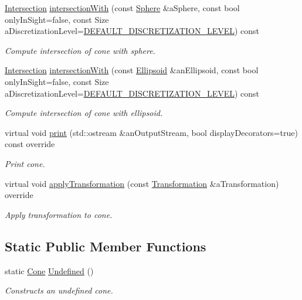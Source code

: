 \begin{DoxyCompactItemize}
\hyperlink{classostk_1_1math_1_1geom_1_1d3_1_1_intersection}{Intersection} \hyperlink{classostk_1_1math_1_1geom_1_1d3_1_1objects_1_1_cone_a28ee89d65bf8a7d03b28c48af68243ad}{intersection\+With} (const \hyperlink{classostk_1_1math_1_1geom_1_1d3_1_1objects_1_1_sphere}{Sphere} \&a\+Sphere, const bool only\+In\+Sight=false, const Size a\+Discretization\+Level=\hyperlink{_pyramid_8hpp_a3eb9931e85ba4c9718113211e549e91d}{D\+E\+F\+A\+U\+L\+T\+\_\+\+D\+I\+S\+C\+R\+E\+T\+I\+Z\+A\+T\+I\+O\+N\+\_\+\+L\+E\+V\+EL}) const
\begin{DoxyCompactList}\small\item\em Compute intersection of cone with sphere. \end{DoxyCompactList}\item 
\hyperlink{classostk_1_1math_1_1geom_1_1d3_1_1_intersection}{Intersection} \hyperlink{classostk_1_1math_1_1geom_1_1d3_1_1objects_1_1_cone_ac47f327abb71af922d824beca7af0c62}{intersection\+With} (const \hyperlink{classostk_1_1math_1_1geom_1_1d3_1_1objects_1_1_ellipsoid}{Ellipsoid} \&an\+Ellipsoid, const bool only\+In\+Sight=false, const Size a\+Discretization\+Level=\hyperlink{_pyramid_8hpp_a3eb9931e85ba4c9718113211e549e91d}{D\+E\+F\+A\+U\+L\+T\+\_\+\+D\+I\+S\+C\+R\+E\+T\+I\+Z\+A\+T\+I\+O\+N\+\_\+\+L\+E\+V\+EL}) const
\begin{DoxyCompactList}\small\item\em Compute intersection of cone with ellipsoid. \end{DoxyCompactList}\item 
virtual void \hyperlink{classostk_1_1math_1_1geom_1_1d3_1_1objects_1_1_cone_a511e3f582e15b11f9b571ec199fdf707}{print} (std\+::ostream \&an\+Output\+Stream, bool display\+Decorators=true) const override
\begin{DoxyCompactList}\small\item\em Print cone. \end{DoxyCompactList}\item 
virtual void \hyperlink{classostk_1_1math_1_1geom_1_1d3_1_1objects_1_1_cone_a9b783e16344d65dfba68c63d1adca3e1}{apply\+Transformation} (const \hyperlink{classostk_1_1math_1_1geom_1_1d3_1_1_transformation}{Transformation} \&a\+Transformation) override
\begin{DoxyCompactList}\small\item\em Apply transformation to cone. \end{DoxyCompactList}\end{DoxyCompactItemize}
\subsection*{Static Public Member Functions}
\begin{DoxyCompactItemize}
\item 
static \hyperlink{classostk_1_1math_1_1geom_1_1d3_1_1objects_1_1_cone}{Cone} \hyperlink{classostk_1_1math_1_1geom_1_1d3_1_1objects_1_1_cone_a06438bb2e619615fcbbce8097186edbe}{Undefined} ()
\begin{DoxyCompactList}\small\item\em Constructs an undefined cone. \end{DoxyCompactList}\end{DoxyCompactItemize}


